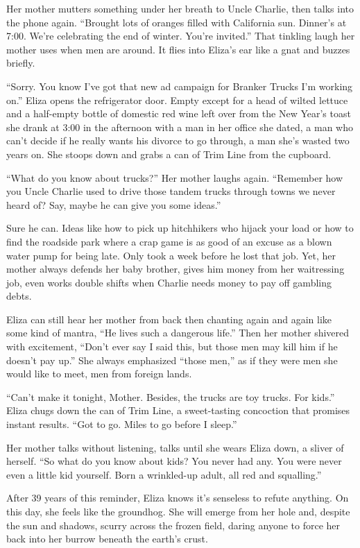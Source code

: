 \documentclass[twoside,10pt]{book}
\begin{document}
Her mother mutters something under her breath to Uncle Charlie, then
talks into the phone again. ``Brought lots of oranges filled with
California sun. Dinner's at 7:00. We're celebrating the end of winter.
You're invited.'' That tinkling laugh her mother uses when men are
around. It flies into Eliza's ear like a gnat and buzzes briefly.

``Sorry. You know I've got that new ad campaign for Branker Trucks I'm
working on.'' Eliza opens the refrigerator door. Empty except for a head
of wilted lettuce and a half-empty bottle of domestic red wine left over
from the New Year's toast she drank at 3:00 in the afternoon with a man
in her office she dated, a man who can't decide if he really wants his
divorce to go through, a man she's wasted two years on. She stoops down
and grabs a can of Trim Line from the cupboard.

``What do you know about trucks?'' Her mother laughs again. ``Remember
how you Uncle Charlie used to drive those tandem trucks through towns we
never heard of? Say, maybe he can give you some ideas.''

Sure he can. Ideas like how to pick up hitchhikers who hijack your load
or how to find the roadside park where a crap game is as good of an
excuse as a blown water pump for being late. Only took a week before he
lost that job. Yet, her mother always defends her baby brother, gives
him money from her waitressing job, even works double shifts when
Charlie needs money to pay off gam­bling debts.

Eliza can still hear her mother from back then chanting again and again
like some kind of mantra, ``He lives such a dangerous life.'' Then her
mother shivered with excitement, ``Don't ever say I said this, but those
men may kill him if he doesn't pay up.'' She always emphasized ``those
men,'' as if they were men she would like to meet, men from foreign
lands.

``Can't make it tonight, Mother. Besides, the trucks are toy trucks. For
kids.'' Eliza chugs down the can of Trim Line, a sweet-tasting
concoction that promises instant results. ``Got to go. Miles to go
before I sleep.''

Her mother talks without listening, talks until she wears Eliza down, a
sliver of herself. ``So what do you know about kids? You never had any.
You were never even a little kid yourself. Born a wrinkled-up adult, all
red and squalling.''

After 39 years of this reminder, Eliza knows it's senseless to refute
anything. On this day, she feels like the groundhog. She will emerge
from her hole and, despite the sun and shadows, scurry across the frozen
field, daring anyone to force her back into her burrow beneath the
earth's crust.
\end{document}
